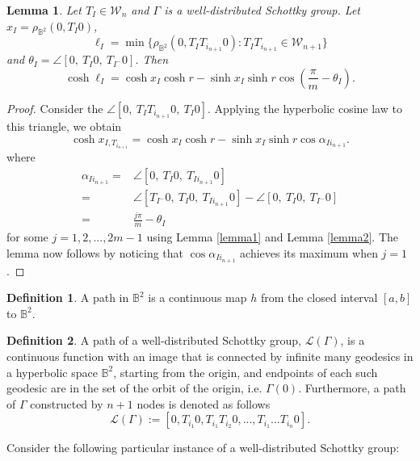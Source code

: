\documentclass[12pt,oneside]{sfsuthesis}
\theoremstyle{plain} %
\newtheorem{lemma}[theorem]{Lemma}
\theoremstyle{definition}  %
\newtheorem{definition}{Definition}[chapter]
\theoremstyle{remark}  %
\theoremstyle{plain}
\begin{document}
{\begin{lemma}\label{upper bound lemma}
Let $T_I\in{\mathcal W}_n$ and $\Gamma$ is a well-distributed Schottky group. Let $x_I = \rho_{\mathbb{B}^2}(0, T_I0)$, 
$$
\ell_I = \min \{ \rho_{\mathbb{B}^2}(0, T_{I}T_{i_{n+1}}0):  T_IT_{i_{n+1}}\in {\mathcal W}_{n+1}\}
$$ 
and $\theta_I = \angle [0,  \ T_I0,  \ T_{I^{-}}0]$.
Then
$$
\cosh \ell_I = \cosh x_I \cosh r-\sinh x_I  \sinh r \cos \left(\frac{\pi}{m}-\theta_I\right).
$$
\end{lemma}
\begin{proof}
Consider the $\angle [0, \ T_{I}T_{i_{n+1}}0, \ T_I0]$. Applying the hyperbolic cosine law to  this triangle, we obtain
$$
\cosh x_{I,T_{i_{n+1}}} = \cosh x_I \cosh r-\sinh x_I  \sinh r \cos \alpha_{Ii_{n+1}}.
$$
where 
$$
\begin{aligned}
\alpha_{Ii_{n+1}} =  & \angle [0, \ T_{I}0, \ T_{Ii_{n+1}}0] \\
 = & \angle [T_{I^-}0 , \ T_{I}0, \ T_{Ii_{n+1}}0] - \angle [0,  \ T_I0,  \ T_{I^{-}}0] \\
 = & \frac{j\pi}{m}-\theta_I
\end{aligned}
$$ 
for some $j=1,2,...,2m-1$ using Lemma \ref{lemma1} and Lemma \ref{lemma2}. The lemma now follows by noticing that $\cos\alpha_{Ii_{n+1}}$ achieves its maximum when $j=1$. 
\end{proof}



\begin{definition}
A path in $\mathbb{B}^2$ is a continuous map $h$ from the closed interval $[a,b]$ to $\mathbb{B}^2$.
\end{definition}




\begin{definition}
A path of a well-distributed Schottky group, $\mathcal{L}(\Gamma)$, is a continuous function with an image that is connected by infinite many geodesics in a hyperbolic space $\mathbb{B}^2$, starting from the origin, and endpoints of each such geodesic are in the set of the orbit of the origin, i.e. $\Gamma(0)$. Furthermore, a path of $\Gamma$ constructed by $n+1$ nodes is denoted as follows
$$
\mathcal{L}(\Gamma):=[0,T_{i_1}0,T_{i_1}T_{i_2}0,...,T_{i_1}...T_{i_n}0].
$$
\end{definition}





Consider the following particular instance of a well-distributed Schottky group:

}
\end{document}
